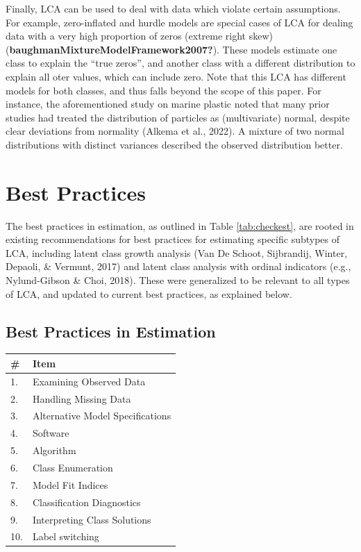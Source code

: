 \documentclass[
  ,man,floatsintext]{apa6}
\begin{document}
Finally, LCA can be used to deal with data which violate certain assumptions.
For example, zero-inflated and hurdle models are special cases of LCA for dealing data with a very high proportion of zeros (extreme right skew) (\textbf{baughmanMixtureModelFramework2007?}).
These models estimate one class to explain the ``true zeros'',
and another class with a different distribution to explain all oter values, which can include zero.
Note that this LCA has different models for both classes,
and thus falls beyond the scope of this paper.
For instance, the aforementioned study on marine plastic noted that many prior studies had treated the distribution of particles as (multivariate) normal, despite clear deviations from normality (Alkema et al., 2022).
A mixture of two normal distributions with distinct variances described the observed distribution better.

\hypertarget{best-practices}{%
\section{Best Practices}\label{best-practices}}

The best practices in estimation, as outlined in Table
\ref{tab:checkest}, are rooted in existing recommendations for best
practices for estimating specific subtypes of LCA,
including latent
class growth analysis (Van De Schoot, Sijbrandij, Winter, Depaoli, \& Vermunt, 2017) and latent
class analysis with ordinal indicators (e.g., Nylund-Gibson \& Choi, 2018).
These were generalized to be relevant to all types of LCA, and updated to current best practices, as explained below.

\hypertarget{best-practices-in-estimation}{%
\subsection{Best Practices in Estimation}\label{best-practices-in-estimation}}

\begin{tabular}[t]{l|l}
\hline
\# & Item\\
\hline
1. & Examining Observed Data\\
\hline
2. & Handling Missing Data\\
\hline
3. & Alternative Model Specifications\\
\hline
4. & Software\\
\hline
5. & Algorithm\\
\hline
6. & Class Enumeration\\
\hline
7. & Model Fit Indices\\
\hline
8. & Classification Diagnostics\\
\hline
9. & Interpreting Class Solutions\\
\hline
10. & Label switching\\
\hline
\end{tabular}
\end{document}

